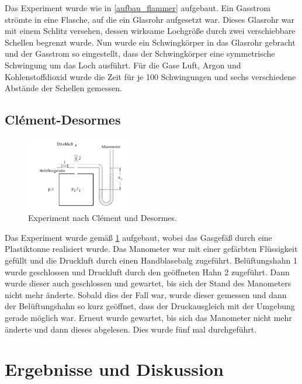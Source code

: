 \documentclass[
	a4paper,
	12pt,
	pagesize,
	ngerman
]{scrartcl}
\begin{document}
	Das Experiment wurde wie in \cref{aufbau_flammer} aufgebaut.
	Ein Gasstrom strömte in eine Flasche, auf die ein Glasrohr aufgesetzt war.
	Dieses Glasrohr war mit einem Schlitz versehen, dessen wirksame Lochgröße durch zwei verschiebbare Schellen begrenzt wurde.
	Nun wurde ein Schwingkörper in das Glasrohr gebracht und der Gasstrom so eingestellt, dass der Schwingkörper eine symmetrische Schwingung um das Loch ausführt.
	Für die Gase Luft, Argon und Kohlenstoffdioxid wurde die Zeit für je 100 Schwingungen und sechs verschiedene Abstände der Schellen gemessen.
	
	\subsection{Clément-Desormes}
	
	\begin{figure}[H]
		\includegraphics[width=0.4\textwidth]{clement}
		\centering
		\caption{Experiment nach Clément und Desormes.} %
		\label{aufbau_clement}
		\centering
	\end{figure} 
	
	Das Experiment wurde gemäß \cref{aufbau_clement} aufgebaut, wobei das Gasgefäß durch eine Plastiktonne realisiert wurde.
	Das Manometer war mit einer gefärbten Flüssigkeit gefüllt und die Druckluft durch einen Handblasebalg zugeführt.
	Belüftungshahn 1 wurde geschlossen und Druckluft durch den geöffneten Hahn 2 zugeführt.
	Dann wurde dieser auch geschlossen und gewartet, bis sich der Stand des Manometers nicht mehr änderte.
	Sobald dies der Fall war, wurde dieser gemessen und dann der Belüftungshahn so kurz geöffnet, dass der Druckausgleich mit der Umgebung gerade möglich war.
	Erneut wurde gewartet, bis sich das Manometer nicht mehr änderte und dann dieses abgelesen.
	Dies wurde fünf mal durchgeführt.
	
	\section{Ergebnisse und Diskussion}
	
\end{document}
